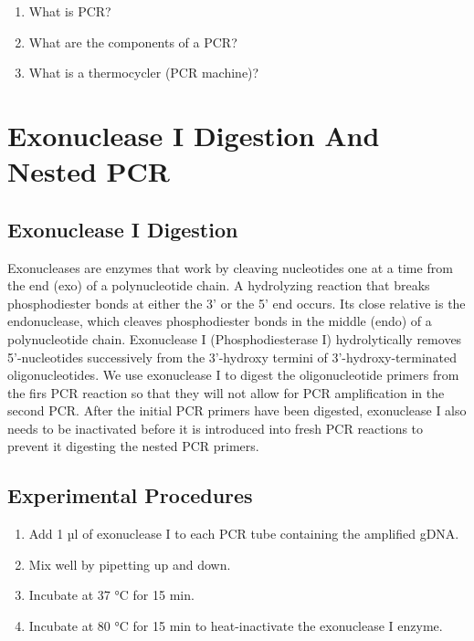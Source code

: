 \documentclass[]{book}
\providecommand{\tightlist}{%
  \setlength{\itemsep}{0pt}\setlength{\parskip}{0pt}}
\theoremstyle{definition}
\theoremstyle{definition}
\theoremstyle{definition}
\theoremstyle{remark}
\begin{document}
\begin{enumerate}
\def\labelenumi{\arabic{enumi}.}
\tightlist
\item
  What is PCR?
\item
  What are the components of a PCR?
\item
  What is a thermocycler (PCR machine)?
\end{enumerate}

\chapter{Exonuclease I Digestion And Nested
PCR}\label{exonuclease-i-digestion-and-nested-pcr}

\section{Exonuclease I Digestion}\label{exonuclease-i-digestion}

Exonucleases are enzymes that work by cleaving nucleotides one at a time
from the end (exo) of a polynucleotide chain. A hydrolyzing reaction
that breaks phosphodiester bonds at either the 3' or the 5' end occurs.
Its close relative is the endonuclease, which cleaves phosphodiester
bonds in the middle (endo) of a polynucleotide chain. Exonuclease I
(Phosphodiesterase I) hydrolytically removes 5'-nucleotides successively
from the 3'-hydroxy termini of 3'-hydroxy-terminated oligonucleotides.
We use exonuclease I to digest the oligonucleotide primers from the firs
PCR reaction so that they will not allow for PCR amplification in the
second PCR. After the initial PCR primers have been digested,
exonuclease I also needs to be inactivated before it is introduced into
fresh PCR reactions to prevent it digesting the nested PCR primers.

\section{Experimental Procedures}\label{experimental-procedures-10}

\begin{enumerate}
\def\labelenumi{\arabic{enumi}.}
\tightlist
\item
  Add 1 µl of exonuclease I to each PCR tube containing the amplified
  gDNA.
\item
  Mix well by pipetting up and down.
\item
  Incubate at 37 °C for 15 min.
\item
  Incubate at 80 °C for 15 min to heat-inactivate the exonuclease I
  enzyme.
\end{enumerate}
\end{document}
